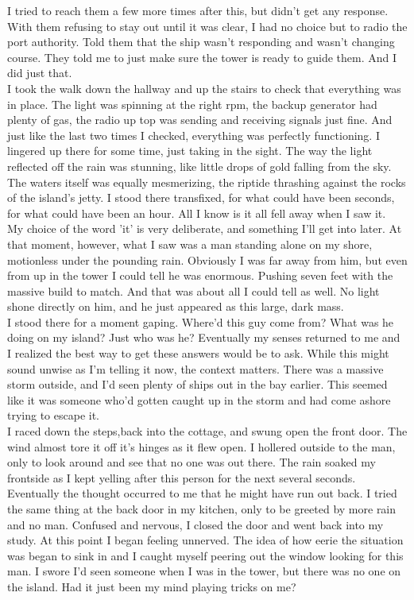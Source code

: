 \documentclass[a5paper]{scrartcl}
\begin{document}
I tried to reach them a few more times after this, but didn't get any response. With them refusing to stay out until it was clear, I had no choice but to radio the port authority. Told them that the ship wasn't responding and wasn't changing course. They told me to just make sure the tower is ready to guide them. And I did just that. \\


I took the walk down the hallway and up the stairs to check that everything was in place. The light was spinning at the right rpm, the backup generator had plenty of gas, the radio up top was sending and receiving signals just fine. And just like the last two times I checked, everything was perfectly functioning. I lingered up there for some time, just taking in the sight. The way the light reflected off the rain was stunning, like little drops of gold falling from the sky. The waters itself was equally mesmerizing, the riptide thrashing against the rocks of the island's jetty. I stood there transfixed, for what could have been seconds, for what could have been an hour. All I know is it all fell away when I saw it.\\


My choice of the word 'it' is very deliberate, and something I'll get into later. At that moment, however, what I saw was a man standing alone on my shore, motionless under the pounding rain. Obviously I was far away from him, but even from up in the tower I could tell he was enormous. Pushing seven feet with the massive build to match. And that was about all I could tell as well. No light shone directly on him, and he just appeared as this large, dark mass. \\


I stood there for a moment gaping. Where'd this guy come from? What was he doing on my island? Just who was he? Eventually my senses returned to me and I realized the best way to get these answers would be to ask. While this might sound unwise as I'm telling it now, the context matters. There was a massive storm outside, and I'd seen plenty of ships out in the bay earlier. This seemed like it was someone who'd gotten caught up in the storm and had come ashore trying to escape it.\\


I raced down the steps,back into the cottage, and swung open the front door. The wind almost tore it off it's hinges as it flew open. I hollered outside to the man, only to look around and see that no one was out there. The rain soaked my frontside as I kept yelling after this person for the next several seconds. Eventually the thought occurred to me that he might have run out back. I tried the same thing at the back door in my kitchen, only to be greeted by more rain and no man. Confused and nervous, I closed the door and went back into my study. At this point I began feeling unnerved. The idea of how eerie the situation was began to sink in and I caught myself peering out the window looking for this man. I swore I'd seen someone when I was in the tower, but there was no one on the island. Had it just been my mind playing tricks on me?\\
\end{document}
